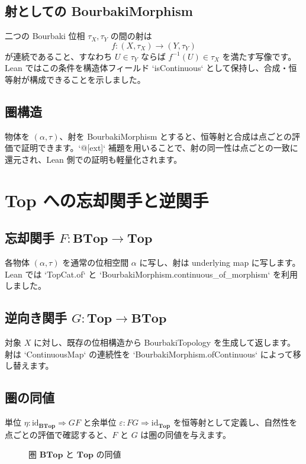 \documentclass[12pt]{ltjsarticle}
\begin{document}
\subsection{射としての BourbakiMorphism}
二つの Bourbaki 位相 \(\tau_X, \tau_Y\) の間の射は
\[
  f : (X, \tau_X) \longrightarrow (Y, \tau_Y)
\]
が連続であること、すなわち \(U \in \tau_Y\) ならば \(f^{-1}(U) \in \tau_X\) を満たす写像です。Lean ではこの条件を構造体フィールド `isContinuous` として保持し、合成・恒等射が構成できることを示しました。

\subsection{圏構造}
物体を \((\alpha, \tau)\)、射を BourbakiMorphism とすると、恒等射と合成は点ごとの評価で証明できます。`@[ext]` 補題を用いることで、射の同一性は点ごとの一致に還元され、Lean 側での証明も軽量化されます。

\section{Top への忘却関手と逆関手}
\subsection{忘却関手 \(F : \mathbf{BTop} \to \mathbf{Top}\)}
各物体 \((\alpha, \tau)\) を通常の位相空間 \(\alpha\) に写し、射は underlying map に写します。Lean では `TopCat.of` と `BourbakiMorphism.continuous_of_morphism` を利用しました。

\subsection{逆向き関手 \(G : \mathbf{Top} \to \mathbf{BTop}\)}
対象 \(X\) に対し、既存の位相構造から BourbakiTopology を生成して返します。射は `ContinuousMap` の連続性を `BourbakiMorphism.ofContinuous` によって移し替えます。

\subsection{圏の同値}
単位 \(\eta : \mathrm{id}_{\mathbf{BTop}} \Rightarrow G F\) と余単位 \(\varepsilon : F G \Rightarrow \mathrm{id}_{\mathbf{Top}}\) を恒等射として定義し、自然性を点ごとの評価で確認すると、\(F\) と \(G\) は圏の同値を与えます。

\begin{figure}[htbp]
  \centering
  \caption{圏 \(\mathbf{BTop}\) と \(\mathbf{Top}\) の同値}
\end{figure}
\end{document}
